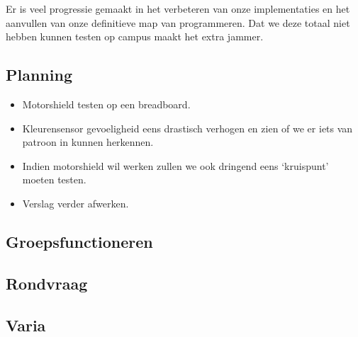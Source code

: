 \documentclass[a4paper,kulak]{kulakarticle} %
\begin{document}
Er is veel progressie gemaakt in het verbeteren van onze implementaties en het aanvullen van onze definitieve map van programmeren. Dat we deze totaal niet hebben kunnen testen op campus maakt het extra jammer. 

\subsection{Planning}
\begin{itemize}
	\item Motorshield testen op een breadboard.
	\item Kleurensensor gevoeligheid eens drastisch verhogen en zien of we er iets van patroon in kunnen herkennen.
	\item Indien motorshield wil werken zullen we ook dringend eens `kruispunt' moeten testen.
	\item Verslag verder afwerken.
\end{itemize}

\subsection{Groepsfunctioneren}

\subsection{Rondvraag}

\subsection{Varia}
\end{document}
